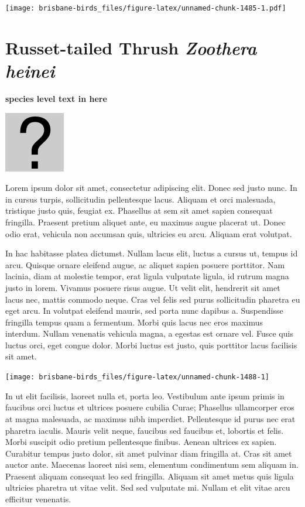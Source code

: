 \documentclass[]{book}
\let\origfigure\figure
\let\endorigfigure\endfigure
\renewenvironment{figure}[1][2] {
  \expandafter\origfigure\expandafter[H]
} {
  \endorigfigure
}
\begin{document}
\texttt{[image: brisbane-birds\_files/figure-latex/unnamed-chunk-1485-1.pdf]}

\section{\texorpdfstring{Russet-tailed Thrush \emph{Zoothera
heinei}}{Russet-tailed Thrush Zoothera heinei}}\label{russet-tailed-thrush-zoothera-heinei}

\textbf{species level text in here}

\begin{figure}
\centering
\includegraphics{assets/missing.png}
\caption{No image for species}
\end{figure}

Lorem ipsum dolor sit amet, consectetur adipiscing elit. Donec sed justo
nunc. In in cursus turpis, sollicitudin pellentesque lacus. Aliquam et
orci malesuada, tristique justo quis, feugiat ex. Phasellus at sem sit
amet sapien consequat fringilla. Praesent pretium aliquet ante, eu
maximus augue placerat ut. Donec odio erat, vehicula non accumsan quis,
ultricies eu arcu. Aliquam erat volutpat.

In hac habitasse platea dictumst. Nullam lacus elit, luctus a cursus ut,
tempus id arcu. Quisque ornare eleifend augue, ac aliquet sapien posuere
porttitor. Nam lacinia, diam at molestie tempor, erat ligula vulputate
ligula, id rutrum magna justo in lorem. Vivamus posuere risus augue. Ut
velit elit, hendrerit sit amet lacus nec, mattis commodo neque. Cras vel
felis sed purus sollicitudin pharetra eu eget arcu. In volutpat eleifend
mauris, sed porta nunc dapibus a. Suspendisse fringilla tempus quam a
fermentum. Morbi quis lacus nec eros maximus interdum. Nullam venenatis
vehicula magna, a egestas est ornare vel. Fusce quis luctus orci, eget
congue dolor. Morbi luctus est justo, quis porttitor lacus facilisis sit
amet.

\begin{figure}
\texttt{[image: brisbane-birds\_files/figure-latex/unnamed-chunk-1488-1]} \caption{insert figure caption}\label{fig:unnamed-chunk-1488}
\end{figure}

In ut elit facilisis, laoreet nulla et, porta leo. Vestibulum ante ipsum
primis in faucibus orci luctus et ultrices posuere cubilia Curae;
Phasellus ullamcorper eros at magna malesuada, ac maximus nibh
imperdiet. Pellentesque id purus nec erat pharetra iaculis. Mauris velit
neque, faucibus sed faucibus et, lobortis et felis. Morbi suscipit odio
pretium pellentesque finibus. Aenean ultrices ex sapien. Curabitur
tempus justo dolor, sit amet pulvinar diam fringilla at. Cras sit amet
auctor ante. Maecenas laoreet nisi sem, elementum condimentum sem
aliquam in. Praesent aliquam consequat leo sed fringilla. Aliquam sit
amet metus quis ligula ultricies pharetra ut vitae velit. Sed sed
vulputate mi. Nullam et elit vitae arcu efficitur venenatis.
\end{document}
